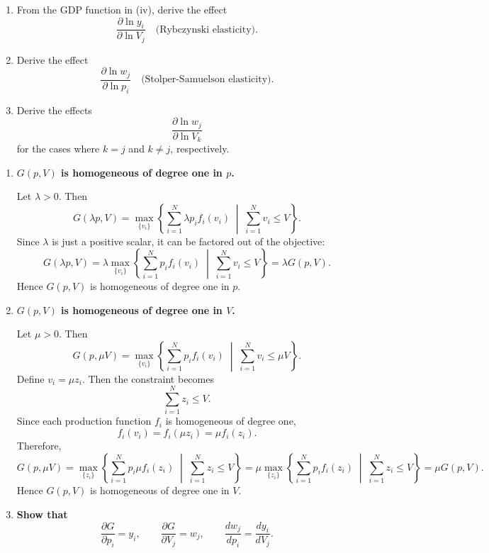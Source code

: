 \begin{tcolorbox}[breakable]
\begin{enumerate}
\item[(v)] From the GDP function in (iv), derive the effect
\[
\frac{\partial \ln y_i}{\partial \ln V_j}
\quad \text{(Rybczynski elasticity)}.
\]

\item[(vi)] Derive the effect
\[
\frac{\partial \ln w_j}{\partial \ln p_i}
\quad \text{(Stolper-Samuelson elasticity)}.
\]

\item[(vii)] Derive the effects
\[
\frac{\partial \ln w_j}{\partial \ln V_k}
\]
for the cases where \(k = j\) and \(k \neq j\), respectively.
\end{enumerate}

\end{tcolorbox}

\begin{enumerate}
\item[(i)] \textbf{$G(p,V)$ is homogeneous of degree one in $p$.}

Let $\lambda > 0$. Then
\[
G(\lambda p, V)
=
\max_{\{v_i\}}
\left\{
\sum_{i=1}^N \lambda p_i f_i(v_i)
\;\middle|\;
\sum_{i=1}^N v_i \le V
\right\}.
\]
Since $\lambda$ is just a positive scalar, it can be factored out of the objective:
\[
G(\lambda p, V)
=
\lambda
\max_{\{v_i\}}
\left\{
\sum_{i=1}^N p_i f_i(v_i)
\;\middle|\;
\sum_{i=1}^N v_i \le V
\right\}
=
\lambda G(p,V).
\]
Hence $G(p,V)$ is homogeneous of degree one in $p$.

\bigskip

\item[(ii)] \textbf{$G(p,V)$ is homogeneous of degree one in $V$.}

Let $\mu > 0$. Then
\[
G(p,\mu V)
=
\max_{\{v_i\}}
\left\{
\sum_{i=1}^N p_i f_i(v_i)
\;\middle|\;
\sum_{i=1}^N v_i \le \mu V
\right\}.
\]
Define $v_i=\mu z_i$. Then the constraint becomes
\[
\sum_{i=1}^N z_i \le V.
\]
Since each production function $f_i$ is homogeneous of degree one,
\[
f_i(v_i)=f_i(\mu z_i)=\mu f_i(z_i).
\]
Therefore,
\[
G(p,\mu V)
=
\max_{\{z_i\}}
\left\{
\sum_{i=1}^N p_i \mu f_i(z_i)
\;\middle|\;
\sum_{i=1}^N z_i \le V
\right\}
=
\mu
\max_{\{z_i\}}
\left\{
\sum_{i=1}^N p_i f_i(z_i)
\;\middle|\;
\sum_{i=1}^N z_i \le V
\right\}
=
\mu G(p,V).
\]
Hence $G(p,V)$ is homogeneous of degree one in $V$.

\bigskip

\item[(iii)] \textbf{Show that}
\[
\frac{\partial G}{\partial p_i}=y_i,
\qquad
\frac{\partial G}{\partial V_j}=w_j,
\qquad
\frac{d w_j}{d p_i}=\frac{d y_i}{d V_j}.
\]


\end{enumerate}
